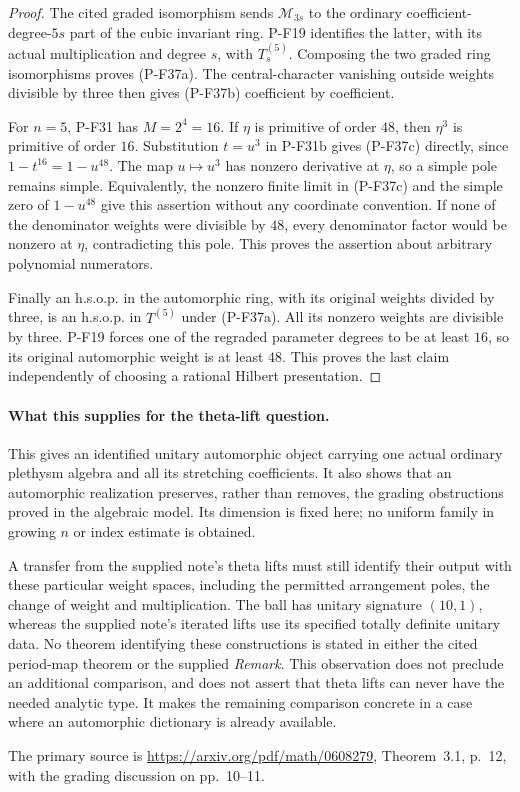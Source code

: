 \begin{proof}
The cited graded isomorphism sends $\mathcal M_{3s}$
to the ordinary coefficient-degree-$5s$ part of the cubic
invariant ring. P-F19 identifies the latter, with its actual
multiplication and degree $s$, with $T^{(5)}_s$.
Composing the two graded ring isomorphisms proves (P-F37a).
The central-character vanishing outside weights divisible
by three then gives (P-F37b) coefficient by coefficient.

For $n=5$, P-F31 has $M=2^4=16$. If $\eta$ is primitive
of order $48$, then $\eta^3$ is primitive of order $16$.
Substitution $t=u^3$ in P-F31b gives (P-F37c) directly,
since $1-t^{16}=1-u^{48}$. The map $u\mapsto u^3$
has nonzero derivative at $\eta$, so a simple pole
remains simple. Equivalently, the nonzero finite limit
in (P-F37c) and the simple zero of $1-u^{48}$ give
this assertion without any coordinate convention.
If none of the denominator weights were divisible by
$48$, every denominator factor would be nonzero at
$\eta$, contradicting this pole. This proves the
assertion about arbitrary polynomial numerators.

Finally an h.s.o.p. in the automorphic ring, with
its original weights divided by three, is an h.s.o.p.
in $T^{(5)}$ under (P-F37a). All its nonzero weights
are divisible by three. P-F19 forces one of the
regraded parameter degrees to be at least $16$,
so its original automorphic weight is at least $48$.
This proves the last claim independently of choosing
a rational Hilbert presentation.
\end{proof}

\paragraph{What this supplies for the theta-lift question.}
This gives an identified unitary automorphic object carrying
one actual ordinary plethysm algebra and all its stretching
coefficients. It also shows that an automorphic realization
preserves, rather than removes, the grading obstructions proved
in the algebraic model. Its dimension is fixed here; no
uniform family in growing $n$ or index estimate is obtained.

A transfer from the supplied note's theta lifts must still
identify their output with these particular weight spaces,
including the permitted arrangement poles, the change of
weight and multiplication. The ball has unitary signature
$(10,1)$, whereas the supplied note's iterated lifts use
its specified totally definite unitary data. No theorem
identifying these constructions is stated in either the
cited period-map theorem or the supplied \emph{Remark}.
This observation does not preclude an additional comparison,
and does not assert that theta lifts can never have the
needed analytic type. It makes the remaining comparison
concrete in a case where an automorphic dictionary is
already available.

The primary source is
\url{https://arxiv.org/pdf/math/0608279}, Theorem~3.1,
p.~12, with the grading discussion on pp.~10--11.
